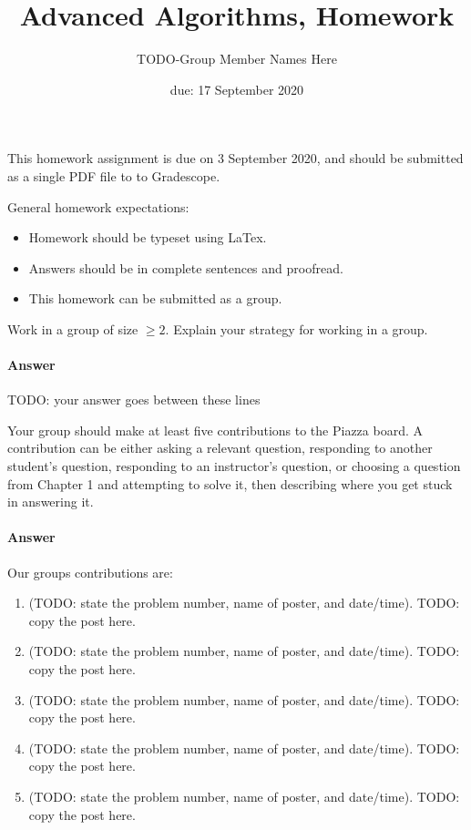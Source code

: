 \documentclass{article}
\title{Advanced Algorithms, Homework \hwnum}
\author{TODO-Group Member Names Here}
\date{due: 17 September 2020}
\begin{document}
\maketitle

This homework assignment is due on 3 September 2020, and should be
submitted as a single PDF file to to Gradescope.

General homework expectations:
\begin{itemize}
    \item Homework should be typeset using LaTex.
    \item Answers should be in complete sentences and proofread.
    \item This homework can be submitted as a group.
\end{itemize}

\nextprob
{}

Work in a group of size $\geq 2$.  Explain your strategy for working in a group.

\paragraph{Answer}


TODO: your answer goes between these lines


\nextprob
{}

Your group should make at least five contributions to the Piazza board.  A
contribution can be either asking a relevant question, responding to another
student's question, responding to an instructor's question, or choosing a
question from Chapter 1 and attempting to solve it, then  describing where you
get stuck in answering it.

\paragraph{Answer}


Our groups contributions are:
\begin{enumerate}
    \item (TODO: state the problem number, name of poster, and date/time). TODO:
        copy the post here.
    \item (TODO: state the problem number, name of poster, and date/time). TODO:
        copy the post here.
    \item (TODO: state the problem number, name of poster, and date/time). TODO:
        copy the post here.
    \item (TODO: state the problem number, name of poster, and date/time). TODO:
        copy the post here.
    \item (TODO: state the problem number, name of poster, and date/time). TODO:
        copy the post here.
\end{enumerate}
\end{document}
